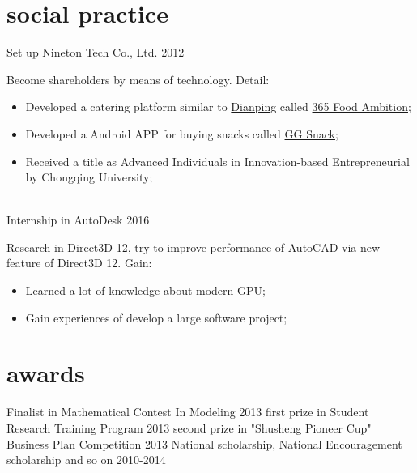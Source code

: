 \documentclass[print]{friggeri-cv} %
\begin{document}
\section{social practice}
\begin{entrylist}
\entryact
{Set up \href{http://nineton.cn/}{Nineton Tech Co., Ltd.}}
{2012}
{Become shareholders by means of technology. Detail:
\begin{itemize}
    \item Developed a catering platform similar to \href{https://www.dianping.com/}{Dianping} called \href{http://nineton.cn/product.php?id=17}{365 Food Ambition};
    \item Developed a Android APP for buying snacks called \href{http://apk.gfan.com/Product/App584080.html}{GG Snack};
    \item Received a title as Advanced Individuals in Innovation-based Entrepreneurial by Chongqing University;
\end{itemize}
}
\\
\entryact
{Internship in AutoDesk}
{2016}
{Research in Direct3D 12, try to improve performance of AutoCAD via new feature of Direct3D 12. Gain:
\begin{itemize}
    \item Learned a lot of knowledge about modern GPU;
    \item Gain experiences of develop a large software project;
\end{itemize}
}
\end{entrylist}

\section{awards}

\begin{entrylist}
\entryac
{Finalist in Mathematical Contest In Modeling}
{2013}
\entryac
{first prize in Student Research Training Program}
{2013}
\entryac
{second prize in "Shusheng Pioneer Cup" Business Plan Competition}
{2013}
\entryac
{National scholarship, National Encouragement scholarship and so on}
{2010-2014}
\end{entrylist}
\end{document}
